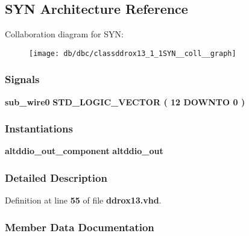 \subsection{S\+YN Architecture Reference}
\label{classddrox13_1_1SYN}


Collaboration diagram for S\+YN\+:\nopagebreak
\begin{figure}[H]
\begin{center}
\leavevmode
\texttt{[image: db/dbc/classddrox13\_1\_1SYN\_\_coll\_\_graph]}
\end{center}
\end{figure}
\subsubsection*{Signals}
 \begin{DoxyCompactItemize}
\item 
{\bf sub\+\_\+wire0} {\bfseries \textcolor{comment}{S\+T\+D\+\_\+\+L\+O\+G\+I\+C\+\_\+\+V\+E\+C\+T\+OR}\textcolor{vhdlchar}{ }\textcolor{vhdlchar}{(}\textcolor{vhdlchar}{ }\textcolor{vhdlchar}{ } \textcolor{vhdldigit}{12} \textcolor{vhdlchar}{ }\textcolor{keywordflow}{D\+O\+W\+N\+TO}\textcolor{vhdlchar}{ }\textcolor{vhdlchar}{ } \textcolor{vhdldigit}{0} \textcolor{vhdlchar}{ }\textcolor{vhdlchar}{)}\textcolor{vhdlchar}{ }} 
\end{DoxyCompactItemize}
\subsubsection*{Instantiations}
 \begin{DoxyCompactItemize}
\item 
{\bf altddio\+\_\+out\+\_\+component}  {\bfseries altddio\+\_\+out}   
\end{DoxyCompactItemize}


\subsubsection{Detailed Description}


Definition at line {\bf 55} of file {\bf ddrox13.\+vhd}.



\subsubsection{Member Data Documentation}

